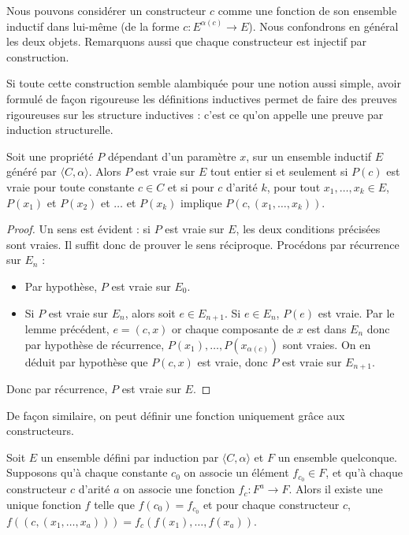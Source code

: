 \begin{rmk}
    Nous pouvons considérer un constructeur $c$ comme une fonction de son ensemble inductif dans lui-même (de la forme $c : E^{\alpha(c)} \to E$). Nous confondrons en général les deux objets. Remarquons aussi que chaque constructeur est injectif par construction.
\end{rmk}

Si toute cette construction semble alambiquée pour une notion aussi simple, avoir formulé de façon rigoureuse les définitions inductives permet de faire des preuves rigoureuses sur les structure inductives : c'est ce qu'on appelle une preuve par induction structurelle.

\begin{them}
    Soit une propriété $P$ dépendant d'un paramètre $x$, sur un ensemble inductif $E$ généré par $\langle C,\alpha\rangle$. Alors $P$ est vraie sur $E$ tout entier si et seulement si $P(c)$ est vraie pour toute constante $c\in C$ et si pour $c$ d'arité $k$, pour tout $x_1,\ldots,x_k\in E$, $P(x_1)$ et $P(x_2)$ et $\ldots$ et $P(x_k)$ implique $P(c,(x_1,\ldots,x_k))$.
\end{them}

\begin{proof}
    Un sens est évident : si $P$ est vraie sur $E$, les deux conditions précisées sont vraies. Il suffit donc de prouver le sens réciproque. Procédons par récurrence sur $E_n$ :
    \begin{itemize}[label=$\bullet$]
        \item Par hypothèse, $P$ est vraie sur $E_0$.
        \item Si $P$ est vraie sur $E_n$, alors soit $e\in E_{n+1}$. Si $e\in E_n$, $P(e)$ est vraie. Par le lemme précédent, $e = (c,x)$ or chaque composante de $x$ est dans $E_n$ donc par hypothèse de récurrence, $P(x_1),\ldots,P(x_{\alpha(c)})$ sont vraies. On en déduit par hypothèse que $P(c,x)$ est vraie, donc $P$ est vraie sur $E_{n+1}$.
    \end{itemize}

    Donc par récurrence, $P$ est vraie sur $E$.
\end{proof}

De façon similaire, on peut définir une fonction uniquement grâce aux constructeurs.

\begin{them}
    Soit $E$ un ensemble défini par induction par $\langle C,\alpha\rangle$ et $F$ un ensemble quelconque. Supposons qu'à chaque constante $c_0$ on associe un élément $f_{c_0} \in F$, et qu'à chaque constructeur $c$ d'arité $a$ on associe une fonction $f_c : F^a \to F$. Alors il existe une unique fonction $f$ telle que $f(c_0) = f_{c_0}$ et pour chaque constructeur $c$, $f((c,(x_1,\ldots,x_a))) = f_c(f(x_1),\ldots,f(x_a))$.
\end{them}

